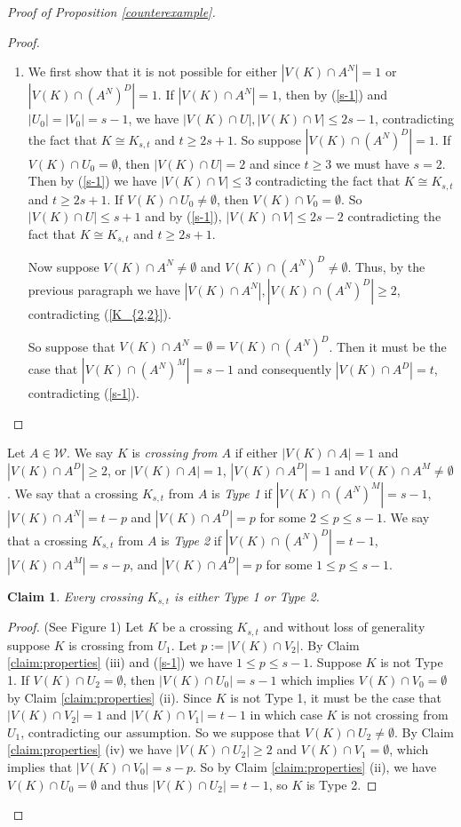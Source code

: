 \documentclass[oneside,12pt]{memoir}
\newtheorem{claim}[theorem]{Claim}
\begin{document}
\begin{proof}[Proof of Proposition \ref{counterexample}]
\begin{proof}
\begin{enumerate}
\item We first show that it is not possible for either $|V(K)\cap A^N|=1$ or $|V(K)\cap (A^N)^D|=1$. If $|V(K)\cap A^N|=1$, then by (\ref{s-1}) and $|U_0|=|V_0|=s-1$, we have $|V(K)\cap U|, |V(K)\cap V|\leq 2s-1$, contradicting the fact that $K\cong K_{s,t}$ and $t\geq 2s+1$.  So suppose $|V(K)\cap (A^N)^D|=1$.  If $V(K)\cap U_0=\emptyset$, then $|V(K)\cap U|=2$ and since $t\geq 3$ we must have $s=2$. Then by (\ref{s-1}) we have $|V(K)\cap V|\leq 3$ contradicting the fact that $K\cong K_{s,t}$ and $t\geq 2s+1$.  If $V(K)\cap U_0\neq \emptyset$, then $V(K)\cap V_0=\emptyset$.  So $|V(K)\cap U|\leq s+1$ and by (\ref{s-1}), $|V(K)\cap V|\leq 2s-2$ contradicting the fact that $K\cong K_{s,t}$ and $t\geq 2s+1$.

Now suppose $V(K)\cap A^N\neq\emptyset$ and $V(K)\cap (A^N)^D\neq\emptyset$. Thus, by the previous paragraph we have $|V(K)\cap A^N|, |V(K)\cap (A^N)^D|\geq 2$, contradicting (\ref{K_{2,2}}).

So suppose that $V(K)\cap A^N=\emptyset=V(K)\cap (A^N)^D$.  Then it must be the case that $|V(K)\cap (A^N)^M|=s-1$ and consequently $|V(K)\cap A^D|=t$, contradicting (\ref{s-1}).

\end{enumerate}

\end{proof}

Let $A\in\mathcal{W}$.  We say $K$ is \emph{crossing from $A$} if either $|V(K)\cap A|=1$ and $|V(K)\cap A^D|\geq 2$, or $|V(K)\cap A|=1$, $|V(K)\cap A^D|=1$ and $V(K)\cap A^M\neq \emptyset$.  We say that a crossing $K_{s,t}$ from $A$ is \emph{Type 1} if $|V(K)\cap (A^N)^M|=s-1$, $|V(K)\cap A^N|=t-p$ and $|V(K)\cap A^D|=p$ for some $2\leq p\leq s-1$.  We say that a crossing $K_{s,t}$ from $A$ is \emph{Type 2} if $|V(K)\cap (A^N)^D|=t-1$, $|V(K)\cap A^M|=s-p$, and $|V(K)\cap A^D|=p$ for some $1\leq p\leq s-1$.



\begin{claim}\label{types}
Every crossing $K_{s,t}$ is either Type 1 or Type 2.
\end{claim}

\begin{proof} (See Figure 1) Let $K$ be a crossing $K_{s,t}$ and without loss of generality suppose $K$ is crossing from $U_1$.  Let $p:=|V(K)\cap V_2|$. By Claim \ref{claim:properties} (iii) and (\ref{s-1}) we have $1\leq p\leq s-1$.  Suppose $K$ is not Type 1.  If $V(K)\cap U_2=\emptyset$, then $|V(K)\cap U_0|=s-1$ which implies $V(K)\cap V_0=\emptyset$ by Claim \ref{claim:properties} (ii).  Since $K$ is not Type 1, it must be the case that $|V(K)\cap V_2|=1$ and $|V(K)\cap V_1|=t-1$ in which case $K$ is not crossing from $U_1$, contradicting our assumption.  So we suppose that $V(K)\cap U_2\neq \emptyset$.  By Claim \ref{claim:properties} (iv) we have $|V(K)\cap U_2|\geq 2$ and $V(K)\cap V_1=\emptyset$, which implies that $|V(K)\cap V_0|=s-p$.  So by Claim \ref{claim:properties} (ii), we have $V(K)\cap U_0=\emptyset$ and thus $|V(K)\cap U_2|=t-1$, so $K$ is Type 2.


\end{proof}
\end{proof}
\end{document}
